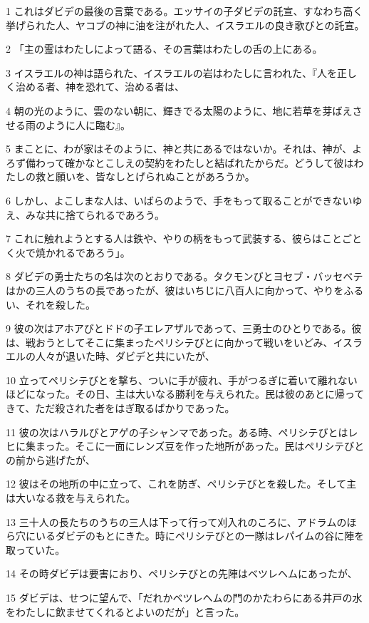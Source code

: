 \par 1 これはダビデの最後の言葉である。エッサイの子ダビデの託宣、すなわち高く挙げられた人、ヤコブの神に油を注がれた人、イスラエルの良き歌びとの託宣。
\par 2 「主の霊はわたしによって語る、その言葉はわたしの舌の上にある。
\par 3 イスラエルの神は語られた、イスラエルの岩はわたしに言われた、『人を正しく治める者、神を恐れて、治める者は、
\par 4 朝の光のように、雲のない朝に、輝きでる太陽のように、地に若草を芽ばえさせる雨のように人に臨む』。
\par 5 まことに、わが家はそのように、神と共にあるではないか。それは、神が、よろず備わって確かなとこしえの契約をわたしと結ばれたからだ。どうして彼はわたしの救と願いを、皆なしとげられぬことがあろうか。
\par 6 しかし、よこしまな人は、いばらのようで、手をもって取ることができないゆえ、みな共に捨てられるであろう。
\par 7 これに触れようとする人は鉄や、やりの柄をもって武装する、彼らはことごとく火で焼かれるであろう」。
\par 8 ダビデの勇士たちの名は次のとおりである。タクモンびとヨセブ・バッセベテはかの三人のうちの長であったが、彼はいちじに八百人に向かって、やりをふるい、それを殺した。
\par 9 彼の次はアホアびとドドの子エレアザルであって、三勇士のひとりである。彼は、戦おうとしてそこに集まったペリシテびとに向かって戦いをいどみ、イスラエルの人々が退いた時、ダビデと共にいたが、
\par 10 立ってペリシテびとを撃ち、ついに手が疲れ、手がつるぎに着いて離れないほどになった。その日、主は大いなる勝利を与えられた。民は彼のあとに帰ってきて、ただ殺された者をはぎ取るばかりであった。
\par 11 彼の次はハラルびとアゲの子シャンマであった。ある時、ペリシテびとはレヒに集まった。そこに一面にレンズ豆を作った地所があった。民はペリシテびとの前から逃げたが、
\par 12 彼はその地所の中に立って、これを防ぎ、ペリシテびとを殺した。そして主は大いなる救を与えられた。
\par 13 三十人の長たちのうちの三人は下って行って刈入れのころに、アドラムのほら穴にいるダビデのもとにきた。時にペリシテびとの一隊はレパイムの谷に陣を取っていた。
\par 14 その時ダビデは要害におり、ペリシテびとの先陣はベツレヘムにあったが、
\par 15 ダビデは、せつに望んで、「だれかベツレヘムの門のかたわらにある井戸の水をわたしに飲ませてくれるとよいのだが」と言った。
